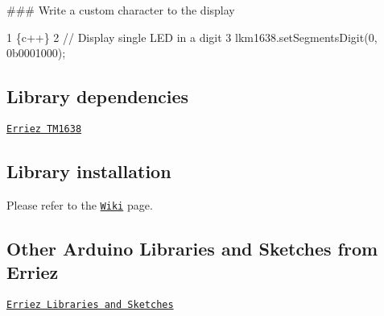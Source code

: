 \#\#\# Write a custom character to the display 
\begin{DoxyCode}
1 \{c++\}
2 // Display single LED in a digit
3 lkm1638.setSegmentsDigit(0, 0b0001000);
\end{DoxyCode}


\subsection*{Library dependencies}


\begin{DoxyItemize}
\item \href{https://github.com/Erriez/ErriezTM1638}{\tt Erriez T\+M1638}
\end{DoxyItemize}

\subsection*{Library installation}

Please refer to the \href{https://github.com/Erriez/ErriezArduinoLibrariesAndSketches/wiki}{\tt Wiki} page.

\subsection*{Other Arduino Libraries and Sketches from Erriez}


\begin{DoxyItemize}
\item \href{https://github.com/Erriez/ErriezArduinoLibrariesAndSketches}{\tt Erriez Libraries and Sketches} 
\end{DoxyItemize}